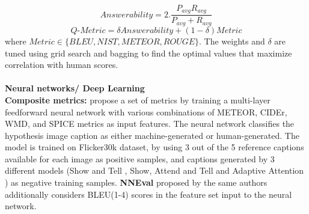 $$ Answerability = 2.\frac{P_{avg}R_{avg}}{P_{avg} + R_{avg}} $$
$$ Q\text{-}Metric = \delta Answerability + (1-\delta)Metric$$
where $Metric \in \{BLEU, NIST, METEOR, ROUGE\}$. The weights and $\delta$ are tuned using grid search and bagging to find the optimal values that maximize correlation with human scores.\\
\\
\textbf{Neural networks/ Deep Learning}\\
\textbf{Composite metrics:}  propose a set of metrics by training a multi-layer feedforward neural network with various combinations of METEOR, CIDEr, WMD, and SPICE metrics as input features. The neural network classifies the hypothesis image caption as either machine-generated or human-generated. The model is trained on Flicker30k  dataset, by using 3 out of the 5 reference captions available for each image as positive samples, and captions generated by 3 different models (Show and Tell , Show, Attend and Tell  and Adaptive Attention ) as negative training samples. \textbf{NNEval}  proposed by the same authors additionally considers BLEU(1-4) scores in the feature set input to the neural network.

